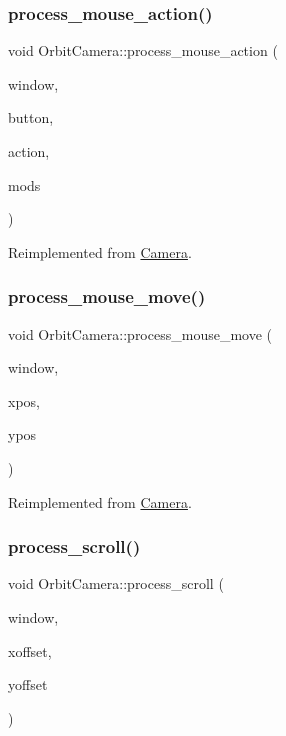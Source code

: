 \subsubsection{\texorpdfstring{process\+\_\+mouse\+\_\+action()}{process\_mouse\_action()}}
{\footnotesize\ttfamily void Orbit\+Camera\+::process\+\_\+mouse\+\_\+action (\begin{DoxyParamCaption}\item[{G\+L\+F\+Wwindow $\ast$}]{window,  }\item[{int}]{button,  }\item[{int}]{action,  }\item[{int}]{mods }\end{DoxyParamCaption})\hspace{0.3cm}{\ttfamily [virtual]}}



Reimplemented from \hyperlink{classCamera_affd5e8a22d61e945ba56d2a807b98e61}{Camera}.

\mbox{\label{classOrbitCamera_a73e280b9244dcbb6b8898a38d0243625}} 
\subsubsection{\texorpdfstring{process\+\_\+mouse\+\_\+move()}{process\_mouse\_move()}}
{\footnotesize\ttfamily void Orbit\+Camera\+::process\+\_\+mouse\+\_\+move (\begin{DoxyParamCaption}\item[{G\+L\+F\+Wwindow $\ast$}]{window,  }\item[{double}]{xpos,  }\item[{double}]{ypos }\end{DoxyParamCaption})\hspace{0.3cm}{\ttfamily [virtual]}}



Reimplemented from \hyperlink{classCamera_abb67395d3094b766d86ad17cedc054c3}{Camera}.

\mbox{\label{classOrbitCamera_a879faaab86c47e485e119d247279904f}} 
\subsubsection{\texorpdfstring{process\+\_\+scroll()}{process\_scroll()}}
{\footnotesize\ttfamily void Orbit\+Camera\+::process\+\_\+scroll (\begin{DoxyParamCaption}\item[{G\+L\+F\+Wwindow $\ast$}]{window,  }\item[{double}]{xoffset,  }\item[{double}]{yoffset }\end{DoxyParamCaption})\hspace{0.3cm}{\ttfamily [virtual]}}



